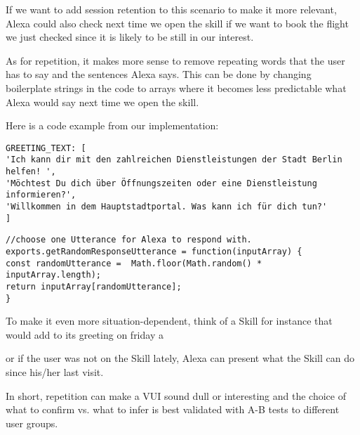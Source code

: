 \noindent If we want to add session retention to this scenario to make it more relevant, Alexa could also check next time we open the skill if we want to book the flight we just checked since it is likely to be still in our interest.

As for repetition, it makes more sense to remove repeating words that the user has to say and the sentences Alexa says. This can be done by changing boilerplate strings in the code to arrays where it becomes less predictable what Alexa would say next time we open the skill.

\noindent  Here is a code example from our implementation:

\begin{verbatim}
GREETING_TEXT: [
'Ich kann dir mit den zahlreichen Dienstleistungen der Stadt Berlin helfen! ',
'Möchtest Du dich über Öffnungszeiten oder eine Dienstleistung informieren?',
'Willkommen in dem Hauptstadtportal. Was kann ich für dich tun?'
]
\end{verbatim}

\begin{verbatim}
//choose one Utterance for Alexa to respond with.
exports.getRandomResponseUtterance = function(inputArray) {
const randomUtterance =  Math.floor(Math.random() * inputArray.length);
return inputArray[randomUtterance];
}
\end{verbatim}

\noindent To make it even more situation-dependent, think of a Skill for instance that would add to its greeting on friday a 


\begin{flushright}
\end{flushright}


\noindent or if the user was not on the Skill lately, Alexa can present what the Skill can do since his/her last visit.



In short, repetition can make a VUI sound dull or interesting and the choice of what to confirm vs. what to infer is best validated with A-B tests to different user groups.




